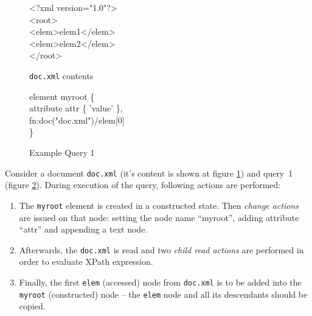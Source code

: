 \documentclass{llncs}
\begin{document}
\begin{figure}[h]
  \centering
  \begin{code}
    \lineno <?xml version="1.0"?>\\
    \lineno <root>\\
    \lineno \><elem>elem1</elem>\\
    \lineno \><elem>elem2</elem>\\
    \lineno </root>
  \end{code}
  \caption{\texttt{doc.xml} contents}
  \label{fig:docXml}
\end{figure}


\begin{figure}[h]
  \centering
  \begin{code}
    \lineno element myroot \{\\
    \lineno \>attribute attr \{ 'value' \},\\
    \lineno \>fn:doc("doc.xml")/elem[0]\\
    \lineno \}
  \end{code}
  \caption{Example Query 1}
  \label{ex:simpleQuery}
\end{figure}
   
Consider a document {\tt doc.xml} (it's content is shown at
figure \ref{fig:docXml}) and query~1 (figure \ref{ex:simpleQuery}).
During execution of the query, following actions are performed:

    
\begin{enumerate}
    \item \label{simpleQuery::nodeCreation}
        The \texttt{myroot} element is created in a constructed state. 
        Then {\em change actions} are
        issued on that node: setting the node name ``myroot'',
        adding attribute ``attr'' and appending a text node.
    \item \label{simpleQuery::copy}
        Afterwards, the \texttt{doc.xml} is read and two {\em child read actions}
        are performed in order to evaluate XPath expression.
    \item 
        Finally, the first \texttt{elem} (accessed) node from \texttt{doc.xml} 
        is to be added into the \texttt{myroot} (constructed) node -- the 
        \texttt{elem} node and all its descendants should be copied. 

\end{enumerate}
\end{document}
